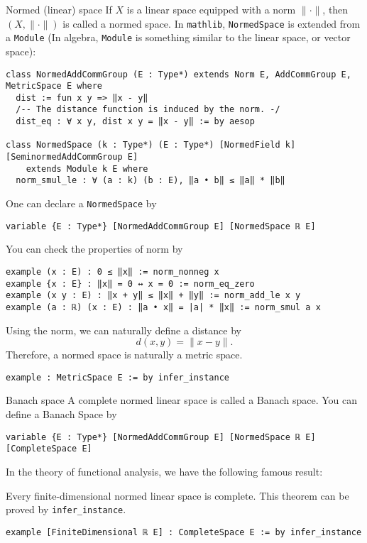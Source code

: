 \documentclass[a4paper]{article}
\begin{document}
\begin{dfn}{Normed (linear) space}  
If \(X\) is a linear space equipped with a norm \(\|\cdot\|\), then \((X, \|\cdot\|)\) is called a normed space. In \texttt{mathlib}, \texttt{NormedSpace} is extended from a \texttt{Module} (In algebra, \texttt{Module} is something similar to the linear space, or vector space):
\begin{lstlisting}[style = lean]
class NormedAddCommGroup (E : Type*) extends Norm E, AddCommGroup E, MetricSpace E where
  dist := fun x y => ‖x - y‖
  /-- The distance function is induced by the norm. -/
  dist_eq : ∀ x y, dist x y = ‖x - y‖ := by aesop

class NormedSpace (k : Type*) (E : Type*) [NormedField k] [SeminormedAddCommGroup E]
    extends Module k E where
  norm_smul_le : ∀ (a : k) (b : E), ‖a • b‖ ≤ ‖a‖ * ‖b‖
\end{lstlisting}
\end{dfn}
One can declare a \texttt{NormedSpace} by
\begin{xmp}{}
\begin{lstlisting}[style=lean]
variable {E : Type*} [NormedAddCommGroup E] [NormedSpace ℝ E]
\end{lstlisting}   
\end{xmp}
You can check the properties of norm by
\begin{xmp}{}
\begin{lstlisting}[style=lean]
example (x : E) : 0 ≤ ‖x‖ := norm_nonneg x
example {x : E} : ‖x‖ = 0 ↔ x = 0 := norm_eq_zero
example (x y : E) : ‖x + y‖ ≤ ‖x‖ + ‖y‖ := norm_add_le x y
example (a : ℝ) (x : E) : ‖a • x‖ = |a| * ‖x‖ := norm_smul a x
\end{lstlisting}
\end{xmp}
Using the norm, we can naturally define a distance by  
\[
d(x, y) = \|x - y\|.
\]  
Therefore, a normed space is naturally a metric space.
\begin{xmp}{}
\begin{lstlisting}[style=lean]
example : MetricSpace E := by infer_instance
\end{lstlisting}
\end{xmp}
\begin{dfn}{Banach space}  
A complete normed linear space is called a Banach space. You can define a Banach Space by
\begin{lstlisting}[style = lean]
variable {E : Type*} [NormedAddCommGroup E] [NormedSpace ℝ E] [CompleteSpace E]
\end{lstlisting}
\end{dfn}
In the theory of functional analysis, we have the following famous result:
\begin{thm}{} 
Every finite-dimensional normed linear space is complete. This theorem can be proved by \texttt{infer\_instance}.
\begin{lstlisting}[style = lean]
example [FiniteDimensional ℝ E] : CompleteSpace E := by infer_instance
\end{lstlisting}
\end{thm}
\end{document}
